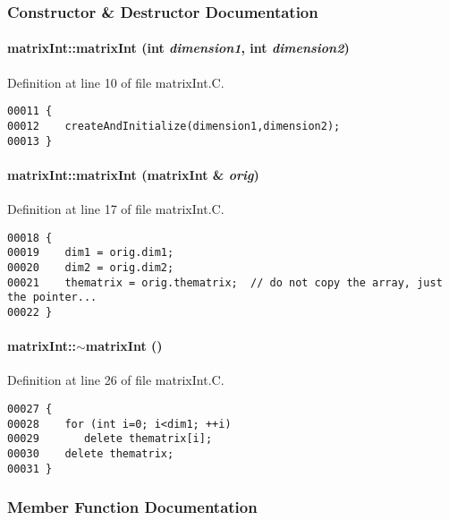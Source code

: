 \subsubsection{Constructor \& Destructor Documentation}
\label{matrixInt_a0}
\paragraph{\setlength{\rightskip}{0pt plus 5cm}matrix\-Int::matrix\-Int (int {\em dimension1}, int {\em dimension2})}\hfill



Definition at line 10 of file matrix\-Int.C.\small\begin{verbatim}00011 {
00012    createAndInitialize(dimension1,dimension2);
00013 }
\end{verbatim}\normalsize 
\label{matrixInt_a1}
\paragraph{\setlength{\rightskip}{0pt plus 5cm}matrix\-Int::matrix\-Int (matrix\-Int \& {\em orig})}\hfill



Definition at line 17 of file matrix\-Int.C.\small\begin{verbatim}00018 {
00019    dim1 = orig.dim1;
00020    dim2 = orig.dim2;
00021    thematrix = orig.thematrix;  // do not copy the array, just the pointer...
00022 }
\end{verbatim}\normalsize 
\label{matrixInt_a2}
\paragraph{\setlength{\rightskip}{0pt plus 5cm}matrix\-Int::$\sim$matrix\-Int ()}\hfill



Definition at line 26 of file matrix\-Int.C.\small\begin{verbatim}00027 {
00028    for (int i=0; i<dim1; ++i)
00029       delete thematrix[i];
00030    delete thematrix; 
00031 }
\end{verbatim}\normalsize 


\subsubsection{Member Function Documentation}
\label{matrixInt_c0}
